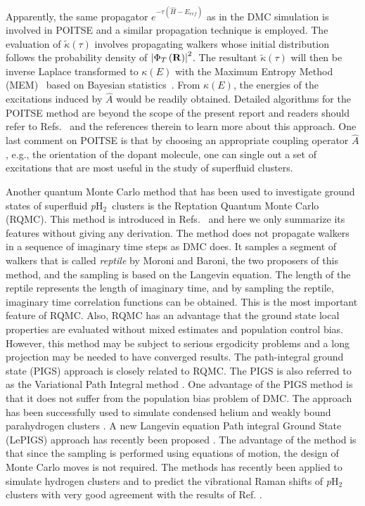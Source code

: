 \documentclass[12pt]{iopart}
\newcommand{\phtwo}{{\em p}H$_2$}
\begin{document}
Apparently, the same propagator
$e^{ -\tau\left( \hat{H}-E_{ref} \right)}$
as in the DMC simulation is involved in POITSE and a similar propagation technique is employed. 
The evaluation of $\tilde{\kappa}\left( \tau \right)$ involves propagating walkers whose initial distribution follows the probability density of $\left| \Phi_T \left( {\bf R} \right) \right|^2$. 
The resultant $\tilde{\kappa}\left( \tau \right)$ will then be inverse Laplace transformed to $\kappa\left(E\right)$ with the Maximum Entropy Method (MEM)~\cite{mem1} based on Bayesian statistics~\cite{baysesian_statistics1}. 
From $\kappa\left( E \right)$, the energies of the excitations induced by $\hat{A}$ would be readily obtained. 
Detailed algorithms for the POITSE method are beyond the scope of the present report and readers should refer to Refs.~\cite{poitse1,poitse2} and the references therein to learn more about this approach. 
One last comment on POITSE is that by choosing an appropriate coupling operator $\hat{A}$,
e.g., the orientation of the dopant molecule,
one can single out a set of excitations that are most useful in the study of  superfluid clusters.

Another quantum Monte Carlo method that has been used to investigate ground states of superfluid \phtwo~clusters is the Reptation Quantum Monte Carlo (RQMC). This method is introduced in Refs.~\cite{rqmc1,rqmc2} and here we only summarize its features without giving any derivation. The method does not propagate walkers in a sequence of imaginary time steps as DMC does. It samples a segment of walkers that is called {\em reptile} by Moroni and Baroni, the two proposers of this method, and the sampling is based on the Langevin equation. The length of the reptile represents the length of imaginary time, and by sampling the reptile, imaginary time correlation functions can be obtained. This is the most important feature of RQMC. Also, RQMC has an advantage that the ground state local properties are evaluated without mixed estimates and population control bias.
However, this method may be subject to serious ergodicity problems and a long projection may be needed to have converged results.
The path-integral ground state (PIGS) approach \cite{Hetenyi1999,Sarsa2000} is closely related to RQMC.
The PIGS is also referred to as the Variational Path Integral method \cite{ceperley_rmp_1995,Sarsa2000,Hinde2006}.
One advantage of the PIGS method is that it does not  suffer from the population bias problem \cite{Boninsegni:2012cn} of DMC. The approach has been successfully used to simulate condensed helium\cite{cuervo2005} and weakly bound   parahydrogen clusters \cite{cuervo2006,cuervo2008,cuervo2009}. A new Langevin equation Path integral Ground State (LePIGS) approach has recently been proposed \cite{constable2013}. The advantage of the method is that since the sampling is performed using equations of motion, the design of Monte Carlo moves is not required. The methods has recently been applied to simulate hydrogen clusters\cite{lepigsH2} and to predict the vibrational Raman shifts of \phtwo clusters \cite{lepigsH2raman} with very good agreement with the results of Ref. \cite{tejeda_raman_ph2_cluster}.
\end{document}
